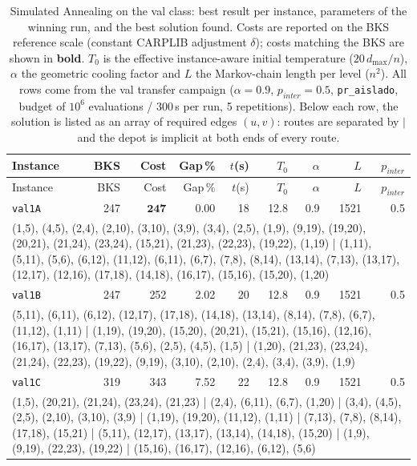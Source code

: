 \begingroup\scriptsize
\begin{longtable}{lrrrrrrrr}
\caption{Simulated Annealing on the val class: best result per instance, parameters of the winning run, and the best solution found. Costs are reported on the BKS reference scale (constant CARPLIB adjustment $\delta$); costs matching the BKS are shown in \textbf{bold}. $T_0$ is the effective instance-aware initial temperature ($20\,d_{\max}/n$), $\alpha$ the geometric cooling factor and $L$ the Markov-chain length per level ($n^2$). All rows come from the val transfer campaign ($\alpha = 0.9$, $p_{inter} = 0.5$, \texttt{pr\_aislado}, budget of $10^6$ evaluations / 300\,s per run, 5 repetitions). Below each row, the solution is listed as an array of required edges $(u,v)$: routes are separated by $|$ and the depot is implicit at both ends of every route.}\label{tab:sa-val-per-instance}\\
\toprule
Instance & BKS & Cost & Gap\,\% & $t$(s) & $T_0$ & $\alpha$ & $L$ & $p_{inter}$ \\
\midrule
\endfirsthead
\toprule
Instance & BKS & Cost & Gap\,\% & $t$(s) & $T_0$ & $\alpha$ & $L$ & $p_{inter}$ \\
\midrule
\endhead
\bottomrule
\endfoot
\texttt{val1A} & 247 & $\mathbf{247}$ & 0.00 & 18 & 12.8 & 0.9 & 1521 & 0.5 \\
\multicolumn{9}{p{0.96\linewidth}}{\tiny\raggedright\arraybackslash (1,5), (4,5), (2,4), (2,10), (3,10), (3,9), (3,4), (2,5), (1,9), (9,19), (19,20), (20,21), (21,24), (23,24), (15,21), (21,23), (22,23), (19,22), (1,19) | (1,11), (5,11), (5,6), (6,12), (11,12), (6,11), (6,7), (7,8), (8,14), (13,14), (7,13), (13,17), (12,17), (12,16), (17,18), (14,18), (16,17), (15,16), (15,20), (1,20)} \\[2pt]
\texttt{val1B} & 247 & 252 & 2.02 & 20 & 12.8 & 0.9 & 1521 & 0.5 \\
\multicolumn{9}{p{0.96\linewidth}}{\tiny\raggedright\arraybackslash (5,11), (6,11), (6,12), (12,17), (17,18), (14,18), (13,14), (8,14), (7,8), (6,7), (11,12), (1,11) | (1,19), (19,20), (15,20), (20,21), (15,21), (15,16), (12,16), (16,17), (13,17), (7,13), (5,6), (2,5), (4,5), (1,5) | (1,20), (21,23), (23,24), (21,24), (22,23), (19,22), (9,19), (3,10), (2,10), (2,4), (3,4), (3,9), (1,9)} \\[2pt]
\texttt{val1C} & 319 & 343 & 7.52 & 22 & 12.8 & 0.9 & 1521 & 0.5 \\
\multicolumn{9}{p{0.96\linewidth}}{\tiny\raggedright\arraybackslash (1,5), (20,21), (21,24), (23,24), (21,23) | (2,4), (6,11), (6,7), (1,20) | (3,4), (4,5), (2,5), (2,10), (3,10), (3,9) | (1,19), (19,20), (11,12), (1,11) | (7,13), (7,8), (8,14), (17,18), (15,21) | (5,11), (12,17), (13,17), (13,14), (14,18), (15,20) | (1,9), (9,19), (22,23), (19,22) | (15,16), (16,17), (12,16), (6,12), (5,6)} \\[2pt]

\end{longtable}
